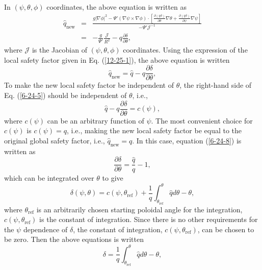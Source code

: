 \documentclass{article}
\newcommand{\tmop}[1]{\ensuremath{\operatorname{#1}}}
\begin{document}
In $(\psi, \theta, \phi)$ coordinates, the above equation is written as
\begin{eqnarray}
  \hat{q}_{\tmop{new}} & = & \frac{g | \nabla \phi |^2 - \Psi' (\nabla \psi
  \times \nabla \phi) \cdot \left[ \frac{\partial (q \delta)}{\partial \theta}
  \nabla \theta + \frac{\partial (q \delta)}{\partial \psi} \nabla \psi
  \right]}{- \Psi' \mathcal{J}^{- 1}} \nonumber\\
  & = & - \frac{g}{\Psi'}  \frac{\mathcal{J}}{R^2} - q \frac{\partial
  \delta}{\partial \theta},  \label{6-24-5}
\end{eqnarray}
where $\mathcal{J}$ is the Jacobian of $(\psi, \theta, \phi)$ coordinates.
Using the expression of the local safety factor given in Eq. (\ref{12-25-1}),
the above equation is written
\begin{equation}
  \hat{q}_{\tmop{new}} = \hat{q} - q \frac{\partial \delta}{\partial \theta},
\end{equation}
To make the new local safety factor be independent of $\theta$, the right-hand
side of Eq. (\ref{6-24-5}) should be independent of $\theta$, i.e.,
\begin{equation}
  \label{6-24-8} \hat{q} - q \frac{\partial \delta}{\partial \theta} = c
  (\psi),
\end{equation}
where $c (\psi)$ can be an arbitrary function of $\psi$. The most convenient
choice for $c (\psi)$ is $c (\psi) = q$, i.e., making the new local safety
factor be equal to the original global safety factor, i.e.,
$\hat{q}_{\tmop{new}} = q$. In this case, equation (\ref{6-24-8}) is written
as
\begin{equation}
  \label{11-12-p1} \frac{\partial \delta}{\partial \theta} = \frac{\hat{q}}{q}
  - 1,
\end{equation}
which can be integrated over $\theta$ to give
\begin{equation}
  \delta (\psi, \theta) = c (\psi, \theta_{\tmop{ref}}) + \frac{1}{q}
  \int_{\theta_{\tmop{ref}}}^{\theta} \hat{q} d \theta - \theta,
\end{equation}
where $\theta_{\tmop{ref}}$ is an arbitrarily chosen starting poloidal angle
for the integration, $c (\psi, \theta_{\tmop{ref}})$ is the constant of
integration. Since there is no other requirements for the $\psi$ dependence of
$\delta$, the constant of integration, $c (\psi, \theta_{\tmop{ref}})$, can be
chosen to be zero. Then the above equations is written
\begin{equation}
  \label{17-3-18-2} \delta = \frac{1}{q} \int_{\theta_{\tmop{ref}}}^{\theta}
  \hat{q} d \theta - \theta,
\end{equation}
\end{document}
